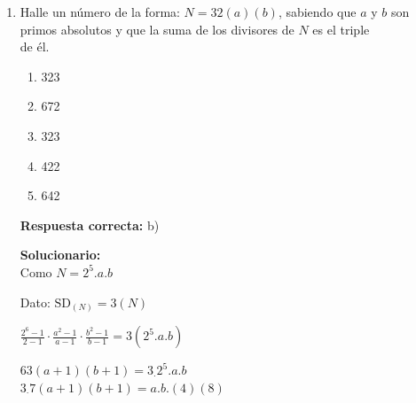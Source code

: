 \begin{enumerate}
	
	\vspace{0.5cm}
	
	\noindent Luego $S = 105, 210, 315, \dots$
	
	\vspace{0.5cm}
	
	\noindent Pero $S < 180 \Longrightarrow S=105$
	
	\vspace{0.5cm}
	
	\noindent Sobrevivieron las personas.
	
	\vspace{6mm}
	
	
	
	\item \noindent Halle un n\'umero de la forma: $N=32(a)(b)$, sabiendo que $a$ y $b$ son \\
	primos absolutos y que la suma de los divisores de $N$ es el triple \\
	de \'el.
	\begin{enumerate}[label=\alph*)]
		\item 323
		\item 672
		\item 323
		\item 422
		\item 642
	\end{enumerate}
	\textbf{Respuesta correcta:} b)
	
	\vspace{2mm}
	\textbf{Solucionario:}\\
	\noindent Como $N = 2^5. a . b$
	
	\noindent Dato: $\text{SD}_{(N)} = 3 (N)$
	
	\noindent $\frac{2^{6}-1}{2-1} \cdot \frac{a^{2}-1}{a-1} \cdot \frac{b^{2}-1}{b-1} = 3 (2^5 . a.b)$
	
	\noindent $63 (a+1)(b+1)= 3_\cdot 2^5.a.b$\\
	\noindent $3_\cdot 7 (a+1)(b+1)= a.b.(4)(8) $
	

\end{enumerate}
